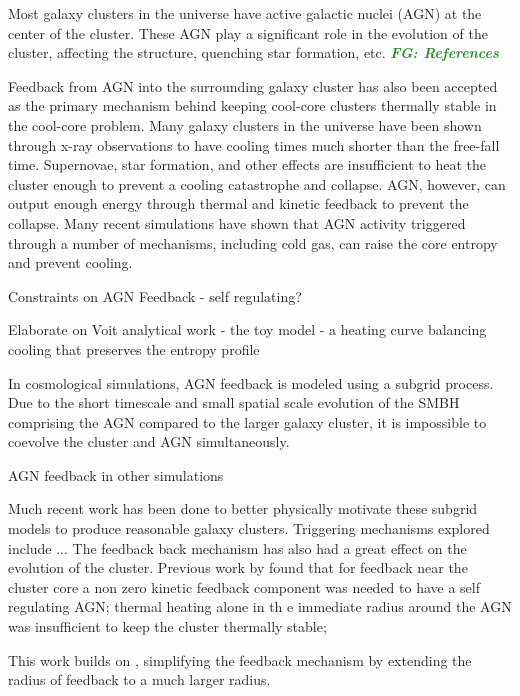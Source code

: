 \documentclass[iop,apjl, twocolappendix]{emulateapj}   %
\def\FG#1{{\textcolor{ForestGreen}{\textbf{\textit{ FG: #1}}}}}
\begin{document}
Most galaxy clusters in the universe have active galactic nuclei (AGN) at the
center of the cluster. These AGN play a significant role in the evolution of
the cluster, affecting the structure, quenching star formation, etc. \FG{References}

Feedback from AGN into the surrounding galaxy cluster has also been accepted as
the primary mechanism behind keeping cool-core clusters thermally stable in the
cool-core problem. Many galaxy clusters in the universe have been shown through
x-ray observations to have cooling times much shorter than the free-fall time.
Supernovae, star formation, and other effects are insufficient to heat the
cluster enough to prevent a cooling catastrophe and collapse. AGN, however, can
output enough energy through thermal and kinetic feedback to prevent the
collapse. Many recent simulations have shown that AGN activity triggered
through a number of mechanisms, including cold gas, can raise the core entropy
and prevent cooling.

\textbullet Constraints on AGN Feedback - self regulating?

\textbullet Elaborate on Voit analytical work - the toy model - a heating curve balancing
cooling that preserves the entropy profile

In cosmological simulations, AGN feedback is modeled using a subgrid process.
Due to the short timescale and small spatial scale evolution of the SMBH
comprising the AGN compared to the larger galaxy cluster, it is impossible to
coevolve the cluster and AGN simultaneously.

\textbullet AGN feedback in other simulations

Much recent work has been done to better physically motivate these subgrid
models to produce reasonable galaxy clusters. Triggering mechanisms explored
include ... The feedback back mechanism has also had a great effect on the
evolution of the cluster. Previous work by \cite{meece_jr_agn_2016} found that
for feedback near the cluster core a non zero kinetic feedback component was
needed to have a self regulating AGN; thermal heating alone in th e immediate
radius around the AGN was insufficient to keep the cluster thermally stable;

\textbullet \FG{Elaborate on Greg's work?}

This work  builds on \cite{meece_jr_agn_2016}, simplifying the feedback
mechanism by extending the radius of feedback to a much larger radius.
\end{document}
